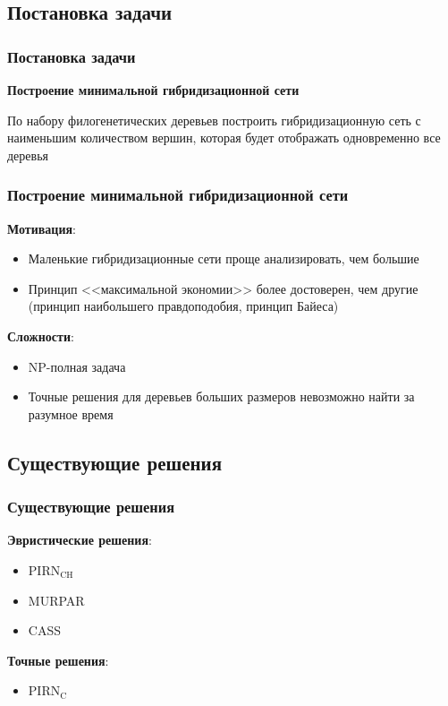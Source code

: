 \documentclass[hyperref={unicode}]{beamer}
\begin{document}
\subsection{Постановка задачи}

\begin{frame}
\frametitle{Постановка задачи}

\textbf{Построение минимальной гибридизационной сети}

По набору филогенетических деревьев построить гибридизационную сеть с наименьшим количеством вершин, которая будет отображать одновременно все деревья

\end{frame}

\begin{frame}
\frametitle{Построение минимальной гибридизационной сети}

\textbf{Мотивация}:
\begin{itemize}
	\item Маленькие гибридизационные сети проще анализировать, чем большие
	\item Принцип <<максимальной экономии>> более достоверен, чем другие (принцип наибольшего правдоподобия, принцип Байеса)
\end{itemize}


\textbf{Сложности}:
\begin{itemize}
	\item NP-полная задача
	\item Точные решения для деревьев больших размеров невозможно найти за разумное время
\end{itemize}

\end{frame}

\subsection{Существующие решения}

\begin{frame}
\frametitle{Существующие решения}

\textbf{Эвристические решения}:
\begin{itemize}
	\item $\mathrm{PIRN_{CH}}$
	\item MURPAR
	\item CASS
\end{itemize}

\textbf{Точные решения}:
\begin{itemize}
	\item $\mathrm{PIRN_C}$
\end{itemize}

\end{frame}
\end{document}
